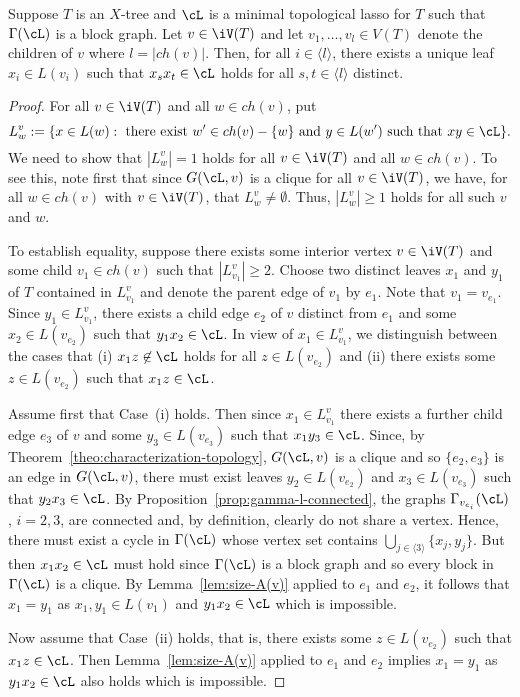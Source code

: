 \begin{pro}\label{prop:x-i-unique}
  Suppose $T$ is an $X$-tree and $\cL$ is a minimal topological lasso for $T$
  such that $\Gamma(\cL)$ is a block graph.  Let $v\in \iV(T)$ and let
  $v_1,\ldots, v_l\in V(T)$ denote the children of $v$ where $l=|ch(v)|$.
  Then, for all $i\in \langle l\rangle$, there exists a unique leaf $x_i\in
  L(v_i)$ such that $x_sx_t\in \cL$ holds for all $s,t\in\langle l\rangle$
  distinct.
\end{pro}
\begin{proof}
  For all $v\in \iV(T)$ and all $w\in ch(v)$, put
$$
L^v_w:=\{x\in L(w): \mbox{ there exist } w'\in ch(v)-\{w\}
\mbox{ and } y\in L(w')
\mbox{ such that } xy\in \cL  \}.
$$
We need to show that $|L^v_w|=1$ holds for all $v\in \iV(T)$ and all $w\in
ch(v)$. To see this, note first that since $G(\cL,v)$ is a clique for all
$v\in \iV(T)$, we have, for all $w\in ch(v)$ with $v\in \iV(T)$, that
$L^v_w\not=\emptyset$.  Thus, $|L^v_w|\geq 1$ holds for all such $v$ and $w$.


To establish equality, suppose there exists some interior vertex $v\in \iV(T)$
and some child $v_1\in ch(v)$ such that $|L^v_{v_1}|\geq 2$.  Choose two
distinct leaves $x_1$ and $y_1$ of $T$ contained in $L^v_{v_1}$ and denote the
parent edge of $v_1$ by $e_1$. Note that $v_1=v_{e_1}$.  Since $y_1\in
L^v_{v_1}$, there exists a child edge $e_2$ of $v$ distinct from $e_1$ and
some $x_2\in L(v_{e_2})$ such that $y_1x_2\in\cL$. In view of $x_1\in
L^v_{v_1}$, we distinguish between the cases that (i) $x_1z\not\in\cL$ holds
for all $z\in L(v_{e_2})$ and (ii) there exists some $z\in L(v_{e_2})$ such
that $x_1z\in\cL$.

Assume first that Case~(i) holds.  Then since $x_1\in L^v_{v_1}$ there exists
a further child edge $e_3$ of $v$ and some $y_3\in L(v_{e_3})$ such that
$x_1y_3\in\cL$.  Since, by Theorem~\ref{theo:characterization-topology},
$G(\cL,v)$ is a clique and so $\{e_2,e_3\}$ is an edge in $G(\cL,v)$, there
must exist leaves $y_2\in L(v_{e_2})$ and $x_3\in L(v_{e_3})$ such that
$y_2x_3\in\cL$. By Proposition~\ref{prop:gamma-l-connected}, the graphs
$\Gamma_{v_{e_i}}(\cL)$, $i=2,3$, are connected and, by definition, clearly do
not share a vertex. Hence, there must exist a cycle in $\Gamma(\cL)$ whose
vertex set contains $\bigcup_{j\in\langle 3\rangle} \{x_j,y_j\}$. But then
$x_1x_2\in \cL$ must hold since $\Gamma(\cL)$ is a block graph and so every
block in $\Gamma(\cL)$ is a clique. By Lemma~\ref{lem:size-A(v)} applied to
$e_1$ and $e_2$, it follows that $x_1=y_1$ as $x_1,y_1\in L(v_1)$ and
$y_1x_2\in \cL$ which is impossible.

Now assume that Case~(ii) holds, that is, there exists some $z\in L(v_{e_2})$
such that $x_1z\in\cL$. Then Lemma~\ref{lem:size-A(v)} applied to $e_1$ and
$e_2$ implies $x_1=y_1$ as $y_1x_2\in\cL$ also holds which is impossible.
\qquad
\end{proof}

